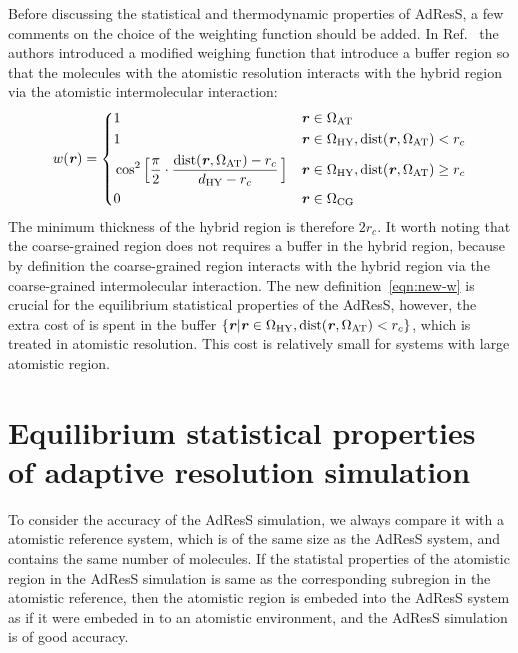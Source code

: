 \documentclass[epjST]{svjour}
\newcommand{\vect}[1]{\textbf{\textit{#1}}}
\newcommand{\dist}[0]{\textrm {dist}}
\newcommand{\AT}[0]{\textrm{AT}}
\newcommand{\HY}[0]{\textrm{HY}}
\newcommand{\CG}[0]{\textrm{CG}}
\begin{document}
Before discussing the statistical and thermodynamic properties of AdResS, a few comments on the
choice of the weighting function should be added. 
In Ref.~\cite{wang2012adaptive} the authors introduced a modified weighing function that
introduce a buffer region so that the molecules with the atomistic resolution
interacts with the hybrid region via the atomistic intermolecular interaction:
\begin{equation}\label{eqn:new-w}
  w(\vect r) =
  \left\{
    \begin{alignedat}{3}
      &1 &\quad& \vect r \in \Omega_\AT\\
      &1 && \vect r \in\Omega_\HY, \dist(\vect r, \Omega_\AT) < r_c \\
      &\cos^2\Big[\frac{\pi}{2 } \cdot \frac{\dist(\vect r, \Omega_\AT) - r_c}{d_{{\HY}} - r_c}\,\Big] && \vect r \in\Omega_\HY, \dist(\vect r, \Omega_\AT) \geq r_c\\
      &0 &    & \vect r \in \Omega_\CG 
    \end{alignedat}
  \right.
\end{equation}
The minimum thickness of the hybrid region is therefore $2r_c$.
It worth noting that the coarse-grained region does not requires a buffer in the hybrid region, because
by definition the coarse-grained region interacts with the hybrid region via the coarse-grained intermolecular interaction.
The new definition~\eqref{eqn:new-w} is crucial for the equilibrium statistical properties of the AdResS,
however, the extra cost of is spent in the buffer $\{\vect r \vert \vect r \in\Omega_\HY, \dist(\vect r, \Omega_\AT) < r_c\}$,
which is treated in atomistic resolution. This cost is relatively small for systems with large atomistic region.

\section{Equilibrium statistical properties of adaptive resolution simulation}
\label{sec:statistical}

To consider the accuracy of the AdResS simulation, we always compare it with a
atomistic reference system, which is of the same size as the AdResS system, and contains the same number of molecules.
If the statistal properties of the atomistic region in the AdResS simulation
is same as the corresponding subregion in the atomistic reference, then
the atomistic region is embeded into the AdResS system as if it were embeded in to
an atomistic environment, and the AdResS simulation is of good accuracy.
\end{document}
